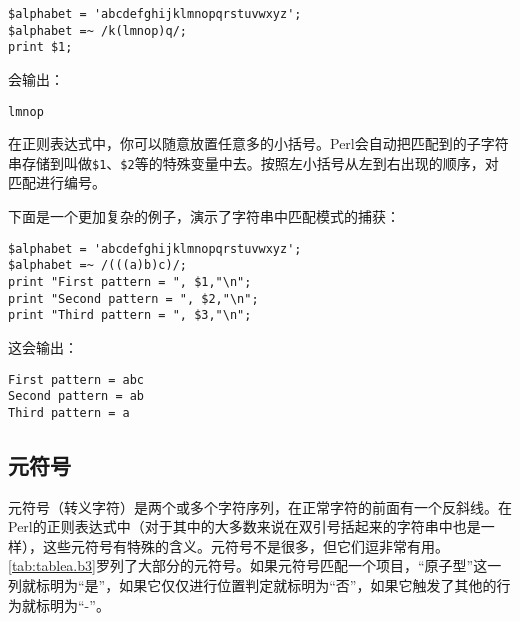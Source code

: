 \begin{lstlisting}
$alphabet = 'abcdefghijklmnopqrstuvwxyz';
$alphabet =~ /k(lmnop)q/;
print $1;
\end{lstlisting}

会输出：

\begin{lstlisting}
lmnop
\end{lstlisting}

在正则表达式中，你可以随意放置任意多的小括号。Perl会自动把匹配到的子字符串存储到叫做\verb|$1|、\verb|$2|等的特殊变量中去。按照左小括号从左到右出现的顺序，对匹配进行编号。

下面是一个更加复杂的例子，演示了字符串中匹配模式的捕获：

\begin{lstlisting}
$alphabet = 'abcdefghijklmnopqrstuvwxyz';
$alphabet =~ /(((a)b)c)/;
print "First pattern = ", $1,"\n";
print "Second pattern = ", $2,"\n";
print "Third pattern = ", $3,"\n";
\end{lstlisting}

这会输出：

\begin{lstlisting}
First pattern = abc
Second pattern = ab
Third pattern = a
\end{lstlisting}

\subsection{元符号}
元符号（转义字符）是两个或多个字符序列，在正常字符的前面有一个反斜线。在Perl的正则表达式中（对于其中的大多数来说在双引号括起来的字符串中也是一样），这些元符号有特殊的含义。元符号不是很多，但它们逗非常有用。\autoref{tab:tablea.b3}罗列了大部分的元符号。如果元符号匹配一个项目，“原子型”这一列就标明为“是”，如果它仅仅进行位置判定就标明为“否”，如果它触发了其他的行为就标明为“-”。

